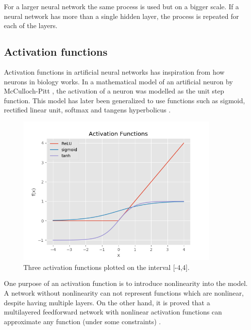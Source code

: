 For a larger neural network the same process is used but on a bigger scale. If a neural network has more than a single hidden layer, the process is repeated for each of the layers.




\subsection{Activation functions} %
\label{activation_functions}

Activation functions in artificial neural networks has inspiration from how neurons in biology works. In a mathematical model of an artificial neuron by McCulloch-Pitt \cite{mcculloch_logical_1943}, the activation of a neuron was modelled as the unit step function. This model has later been generalized to use functions such as sigmoid, rectified linear unit, softmax and tangens hyperbolicus \cite{jain_artificial_1996}.

\begin{figure}[H]
  \centering
    \includegraphics[width=0.9\textwidth]{Assets/Chapter2_Theory/activation_function_overview.png}
    \caption{Three activation functions plotted on the interval [-4,4].}
\end{figure}

One purpose of an activation function is to introduce nonlinearity into the model. A network without nonlinearity can not represent functions which are nonlinear, despite having multiple layers. On the other hand, it is proved that a multilayered feedforward network with nonlinear activation functions can approximate any function (under some constraints) \cite{leshno_multilayer_1993}.

